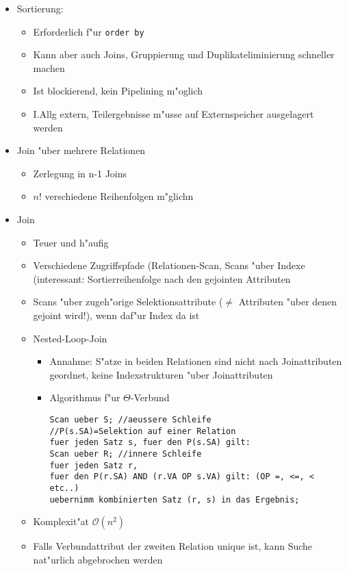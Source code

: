 \documentclass[a4paper, 12pt]{scrartcl}
\begin{document}
\begin{itemize}
	\item
		Sortierung:
		\begin{itemize}
			\item
				Erforderlich f"ur \lstinline$order by$
			\item
				Kann aber auch Joins, Gruppierung und Duplikateliminierung schneller machen
			\item
				Ist blockierend, kein Pipelining m"oglich
			\item
				I.Allg extern, Teilergebnisse m"usse auf Externspeicher ausgelagert werden
		\end{itemize}
	\item
		Join "uber mehrere Relationen
		\begin{itemize}
			\item
				Zerlegung in n-1 Joins
			\item
				$n!$ verschiedene Reihenfolgen m"glichn
		\end{itemize}

	\item
		Join
		\begin{itemize}
			\item
				Teuer und h"aufig
			\item
				Verschiedene Zugriffspfade (Relationen-Scan, Scans "uber Indexe (interessant: Sortierreihenfolge nach den gejointen Attributen
			\item
				Scans "uber zugeh"orige Selektionsattribute ($\neq$ Attributen "uber denen gejoint wird!), wenn daf"ur Index da ist
			\item
				Nested-Loop-Join
				\begin{itemize}
					\item
						Annahme: S"atze in beiden Relationen sind nicht nach Joinattributen geordnet, keine Indexstrukturen "uber Joinattributen
					\item
						Algorithmus f"ur $\Theta$-Verbund
						\begin{lstlisting}
Scan ueber S; //aeussere Schleife
//P(s.SA)=Selektion auf einer Relation
fuer jeden Satz s, fuer den P(s.SA) gilt: 
Scan ueber R; //innere Schleife
fuer jeden Satz r,
fuer den P(r.SA) AND (r.VA OP s.VA) gilt: (OP =, <=, < etc..)
uebernimm kombinierten Satz (r, s) in das Ergebnis;
						\end{lstlisting}
				\end{itemize}
			\item
				Komplexit"at $\mathcal{O}(n^2)$
			\item
				Falls Verbundattribut der zweiten Relation unique ist, kann Suche nat"urlich abgebrochen werden
		\end{itemize}


\end{itemize}
\end{document}
